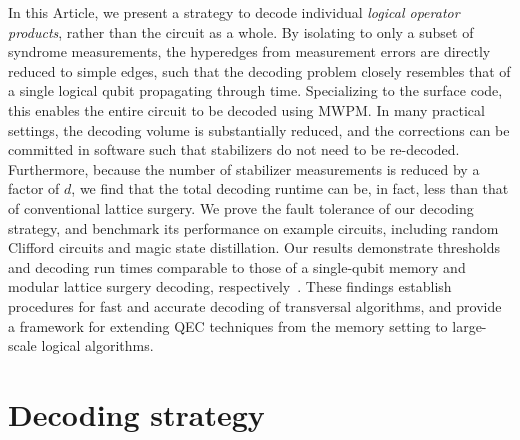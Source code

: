 \documentclass[prx,twocolumn,secnumarabic,balancelastpage,amsmath,amssymb,longbibliography]{revtex4-2}
\begin{document}
In this Article, we present a strategy to decode individual \textit{logical operator products}, rather than the circuit as a whole.
%
By isolating to only a subset of syndrome measurements, the hyperedges from measurement errors are directly reduced to simple edges, such that the decoding problem closely resembles that of a single logical qubit propagating through time.
%
Specializing to the surface code, this enables the entire circuit to be decoded using MWPM.
%
In many practical settings, the decoding volume is substantially reduced, and the corrections can be committed in software such that stabilizers do not need to be re-decoded.
%
Furthermore, because the number of stabilizer measurements is reduced by a factor of $d$, we find that the total decoding runtime can be, in fact, less than that of conventional lattice surgery.
%
We prove the fault tolerance of our decoding strategy, and benchmark its performance on example circuits, including random Clifford circuits and magic state distillation.
%
Our results demonstrate thresholds and decoding run times comparable to those of a single-qubit memory and modular lattice surgery decoding, respectively~\cite{bombin2023modular,tan2023scalable,skoric2023parallel}. 
%
These findings establish procedures for fast and accurate decoding of transversal algorithms, and provide a framework for extending QEC techniques from the memory setting to large-scale logical algorithms.

\section{Decoding strategy}
\end{document}
